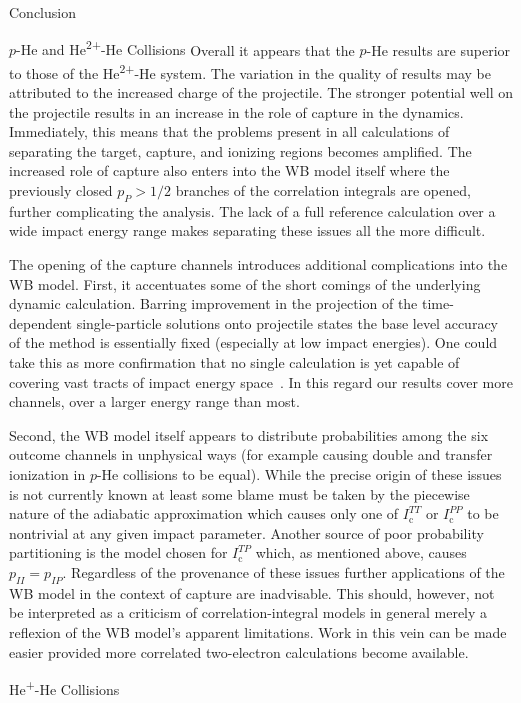 \documentclass[letterpaper, 11 pt]{report}
\begin{document}
\begin{chapter}{Conclusion \label{chap:con}}
\begin{section}{\texorpdfstring{$p$}{p}-He and \texorpdfstring{He\textsuperscript{2+}}{He2+}-He
                   Collisions \label{sec:con-phe2p-he}}
      Overall it appears that the $p$-He results are superior to those of the He\textsuperscript{2+}-He
      system. The variation in the quality of results may be attributed to the increased charge of the
      projectile. The stronger potential well on the projectile results in an increase in the role of
      capture in the dynamics. Immediately, this means that the problems present in all calculations of
      separating the target, capture, and ionizing regions becomes amplified. The increased role of
      capture also enters into the WB model itself where the previously closed $p_P > 1/2$ branches of
      the correlation integrals are opened, further complicating the analysis. The lack of a full
      reference calculation over a wide impact energy range makes separating these issues all the more
      difficult.

      The opening of the capture channels introduces additional complications into the WB model. First,
      it accentuates some of the short comings of the underlying dynamic calculation. Barring
      improvement in the projection of the time-dependent single-particle solutions onto projectile
      states the base level accuracy of the method is essentially fixed (especially at low impact
      energies). One could take this as more confirmation that no single calculation is yet capable of
      covering vast tracts of impact energy space~\cite{LRV-14}. In this regard our results cover more
      channels, over a larger energy range than most.
      
      Second, the WB model itself appears to distribute probabilities among the six outcome channels in
      unphysical ways (for example causing double and transfer ionization in $p$-He collisions to be
      equal). While the precise origin of these issues is not currently known at least some blame must
      be taken by the piecewise nature of the adiabatic approximation which causes only one of
      $I^{TT}_\mathrm{c}$ or $I^{PP}_\mathrm{c}$ to be nontrivial at any given impact parameter. Another
      source of poor probability partitioning is the model chosen for $I^{TP}_\mathrm{c}$ which, as
      mentioned above, causes $p_{II} = p_{IP}$. Regardless of the provenance of these issues further
      applications of the WB model in the context of capture are inadvisable. This should, however, not
      be interpreted as a criticism of correlation-integral models in general merely a reflexion of the
      WB model's apparent limitations. Work in this vein can be made easier provided more correlated
      two-electron calculations become available.

   \end{section}

   \begin{section}{\texorpdfstring{He\textsuperscript{+}}{He+}-He Collisions \label{sec:con-hephe}}

   \end{section}

\end{chapter}

\cleardoublepage
{}
{}

\printbibliography
\end{document}
